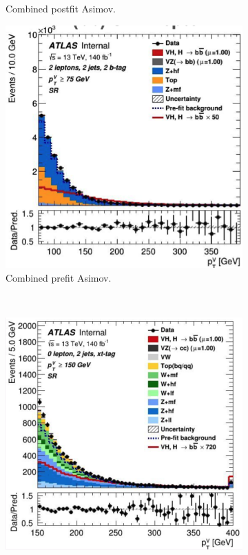\begin{figure}[h!]
\begin{subfigure}[b]{0.32\textwidth}
        \caption{Combined postfit Asimov.}
        \label{fig:fit_new_vhcclimitPostfit}
    \end{subfigure}
    \begin{subfigure}[b]{0.32\textwidth}
      \centering
      \includegraphics[width=\textwidth]{Images/VH/Fit/fromSlides/Postfit/2L_bb_2j.png}
      \caption{Combined prefit Asimov.}
      \label{fig:fit_new_vhcclimitPrefit}
  \end{subfigure} \\
  \begin{subfigure}[b]{0.32\textwidth}
    \centering
    \includegraphics[width=\textwidth]{Images/VH/Fit/fromSlides/Postfit/0L_xt_2j.png}

\end{subfigure}
\end{figure}
